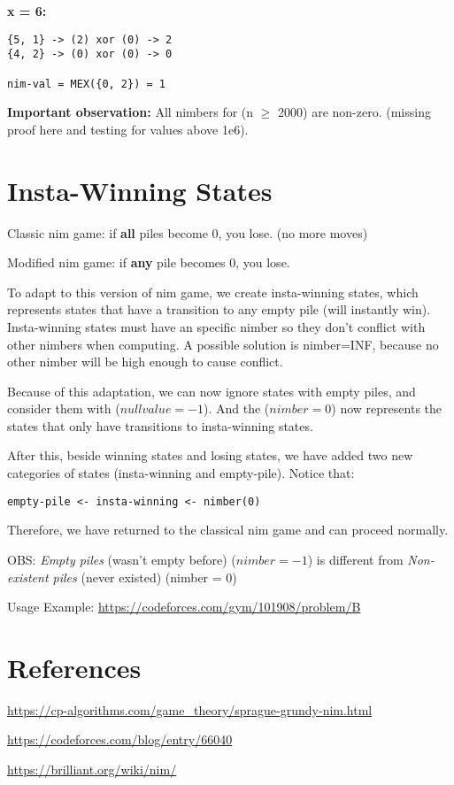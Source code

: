 \textbf{x = 6:}
\begin{lstlisting}
{5, 1} -> (2) xor (0) -> 2
{4, 2} -> (0) xor (0) -> 0
    
nim-val = MEX({0, 2}) = 1
\end{lstlisting}

\textbf{Important observation:} All nimbers for (n $\ge$ 2000) are non-zero.
(missing proof here and testing for values above 1e6).

\section{Insta-Winning States}

Classic nim game: if \textbf{all} piles become 0, you lose. (no more moves)

Modified nim game: if \textbf{any} pile becomes 0, you lose.

To adapt to this version of nim game, we create insta-winning states,
which represents states that have a transition to any empty pile (will instantly win).
Insta-winning states must have an specific nimber so they don't conflict with other nimbers when computing.
A possible solution is nimber=INF, because no other nimber will be high enough to cause conflict. 

Because of this adaptation, we can now ignore states with empty piles, and consider them with ($null value = -1$).
And the ($nimber = 0$) now represents the states that only have transitions to insta-winning states.

After this, beside winning states and losing states, we have added two new categories of states
(insta-winning and empty-pile). Notice that:

\begin{lstlisting}[language=raw]
empty-pile <- insta-winning <- nimber(0)
\end{lstlisting}

Therefore, we have returned to the classical nim game and can proceed normally.

OBS: \textit{Empty piles} (wasn't empty before) ($nimber = -1$) is different from \textit{Non-existent piles} (never existed) (nimber = 0)

Usage Example: \url{https://codeforces.com/gym/101908/problem/B}

\section{References}

\url{https://cp-algorithms.com/game_theory/sprague-grundy-nim.html}

\url{https://codeforces.com/blog/entry/66040}

\url{https://brilliant.org/wiki/nim/}